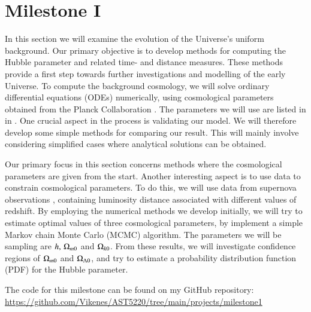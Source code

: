 \section{Milestone I}\label{M1}
In this section we will examine the evolution of the Universe's uniform background. Our primary objective is to develop methods for computing the Hubble parameter and related time- and distance measures. These methods provide a first step towards further investigations and modelling of the early Universe. To compute the background cosmology, we will solve ordinary differential equations (ODEs) numerically, using cosmological parameters obtained from the Planck Collaboration \cite*{Planck2020}. The parameters we will use are listed in  in  . One crucial aspect in the process is validating our model. We will therefore develop some simple methods for comparing our result. This will mainly involve considering simplified cases where analytical solutions can be obtained. 

Our primary focus in this section concerns methods where the cosmological parameters are given from the start. Another interesting aspect is to use data to constrain cosmological parameters. To do this, we will use data from supernova observations \cite{Supernova2014Betoule}, containing luminosity distance associated with different values of redshift. By employing the numerical methods we develop initially, we will try to estimate optimal values of three cosmological parameters, by implement a simple Markov chain Monte Carlo (MCMC) algorithm. The parameters we will be sampling are $h,\,\Omega_{m0}$ and $\Omega_{k0}$. From these results, we will investigate confidence regions of $\Omega_{m0}$ and $\Omega_{\Lambda 0}$, and try to estimate a probability distribution function (PDF) for the Hubble parameter. 

The code for this milestone can be found on my GitHub repository: \url{https://github.com/Vikenes/AST5220/tree/main/projects/milestone1}





